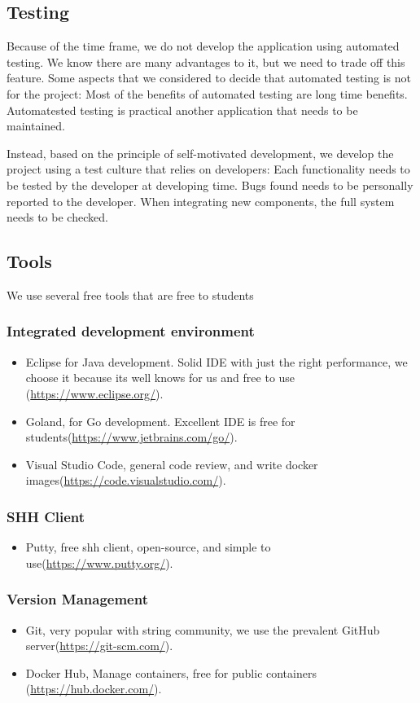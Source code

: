 \subsection{ Testing}
\indent
\indent
Because of the time frame, we do not develop the application using automated testing. We know there are many advantages to it, but we need to trade off this feature. Some aspects that we considered to decide that automated testing is not for the project:
Most of the benefits of automated testing are long time benefits.
Automatested testing is practical another application that needs to be maintained.

Instead, based on the principle of self-motivated development, we develop the project using a test culture that relies on developers:
Each functionality needs to be tested by the developer at developing time.
Bugs found needs to be personally reported to the developer.
When integrating new components, the full system needs to be checked. 

\subsection{Tools}

We use several free tools that are free to students

\subsubsection{Integrated development environment}

\begin{itemize}

	\item  Eclipse for Java development. Solid IDE with just the right performance, we choose it because its well knows for us and free to use (\url{https://www.eclipse.org/}).
	\item  Goland, for Go development. Excellent IDE is free for students(\url{https://www.jetbrains.com/go/}). 
	\item  Visual Studio Code, general code review, and write docker images(\url{https://code.visualstudio.com/}).

\end{itemize}
\subsubsection{SHH Client}
\begin{itemize}
	
	\item  Putty, free shh client, open-source, and simple to use(\url{https://www.putty.org/}).
\end{itemize}

\subsubsection{Version Management}
\begin{itemize}
\item  Git, very popular with string community, we use the prevalent GitHub server(\url{https://git-scm.com/}). 
\item  Docker Hub, Manage containers, free for public containers (\url{https://hub.docker.com/}). 
\end{itemize}
